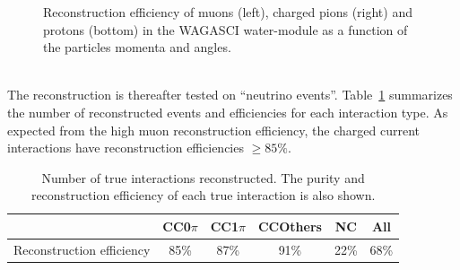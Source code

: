 \begin{figure}
\begin{subfigure}{.49\textwidth}
  \end{subfigure}
  \caption{\label{fig:efficiency_particle} Reconstruction efficiency of muons (left), charged pions (right) and protons (bottom) in the WAGASCI water-module as a function of the particles momenta and angles.}
\end{figure}

\\
The reconstruction is thereafter tested on ``neutrino events''. Table~\ref{tab:reconstructedinteractions} summarizes the number of reconstructed events and efficiencies for each interaction type. As expected from the high muon reconstruction efficiency, the charged current interactions have reconstruction efficiencies $\geq 85\%$.
\begin{table}[htb]
  \small
  \begin{center}
    \begin{tabular}{|c|c|c|c|c|c|}
      \hline
      \hline
      & CC0$\pi$ & CC1$\pi$ & CCOthers & NC & All \\
      \hline
      Reconstruction efficiency & 85\% & 87\% & 91\% & 22\% & 68\% \\
      \hline
      \hline
    \end{tabular}
    \caption{\label{tab:reconstructedinteractions} Number of true interactions reconstructed. The purity and reconstruction efficiency of each true interaction is also shown.}
  \end{center}
\end{table}

